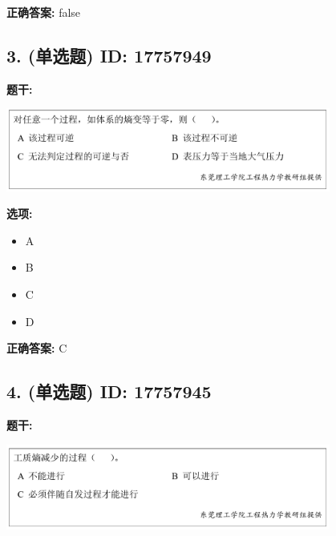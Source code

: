 \documentclass[12pt]{article}
\begin{document}
\textbf{正确答案:}
false

\vspace{0.5em}\hrulefill\vspace{1em}

\subsection*{3. (单选题) \small ID: 17757949}

\textbf{题干:}


\begin{center}\includegraphics[width=0.8\textwidth, height=0.25\textheight, keepaspectratio]{question_3_17757949/title_img_1.png}\end{center}

\textbf{选项:}
\begin{itemize}[leftmargin=*]
  \item A

  \item B

  \item C

  \item D

\end{itemize}

\textbf{正确答案:}
C

\vspace{0.5em}\hrulefill\vspace{1em}

\subsection*{4. (单选题) \small ID: 17757945}

\textbf{题干:}


\begin{center}\includegraphics[width=0.8\textwidth, height=0.25\textheight, keepaspectratio]{question_4_17757945/title_img_1.png}\end{center}
\end{document}
